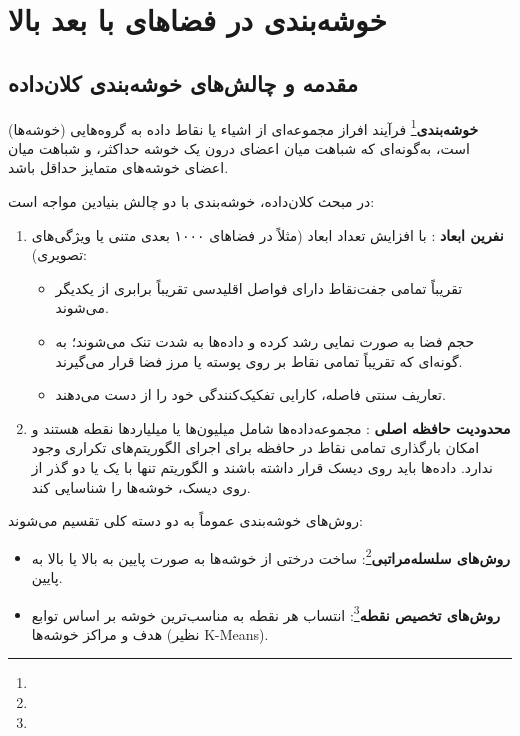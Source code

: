 \chapter{خوشه‌بندی در فضاهای با بعد بالا \texorpdfstring{}{(High-Dimensional Clustering)}}
\label{ch:clustering}

\section{مقدمه و چالش‌های خوشه‌بندی کلان‌داده}
\textbf{خوشه‌بندی}\footnote{} فرآیند افراز مجموعه‌ای از اشیاء یا نقاط داده به گروه‌هایی (خوشه‌ها) است، به‌گونه‌ای که شباهت میان اعضای درون یک خوشه حداکثر، و شباهت میان اعضای خوشه‌های متمایز حداقل باشد.

در مبحث کلان‌داده، خوشه‌بندی با دو چالش بنیادین مواجه است:
\begin{enumerate}
    \item \textbf{نفرین ابعاد }: با افزایش تعداد ابعاد (مثلاً در فضاهای ۱۰۰۰ بعدی متنی یا ویژگی‌های تصویری):
    \begin{itemize}
        \item تقریباً تمامی جفت‌نقاط دارای فواصل اقلیدسی تقریباً برابری از یکدیگر می‌شوند.
        \item حجم فضا به صورت نمایی رشد کرده و داده‌ها به شدت تنک می‌شوند؛ به گونه‌ای که تقریباً تمامی نقاط بر روی پوسته یا مرز فضا قرار می‌گیرند.
        \item تعاریف سنتی فاصله، کارایی تفکیک‌کنندگی خود را از دست می‌دهند.
    \end{itemize}
    \item \textbf{محدودیت حافظه اصلی }: مجموعه‌داده‌ها شامل میلیون‌ها یا میلیاردها نقطه هستند و امکان بارگذاری تمامی نقاط در حافظه برای اجرای الگوریتم‌های تکراری وجود ندارد. داده‌ها باید روی دیسک قرار داشته باشند و الگوریتم تنها با یک یا دو گذر از روی دیسک، خوشه‌ها را شناسایی کند.
\end{enumerate}

روش‌های خوشه‌بندی عموماً به دو دسته کلی تقسیم می‌شوند:
\begin{itemize}
    \item \textbf{روش‌های سلسله‌مراتبی}\footnote{}: ساخت درختی از خوشه‌ها به صورت پایین به بالا یا بالا به پایین.
    \item \textbf{روش‌های تخصیص نقطه}\footnote{}: انتساب هر نقطه به مناسب‌ترین خوشه بر اساس توابع هدف و مراکز خوشه‌ها (نظیر K-Means).
\end{itemize}


